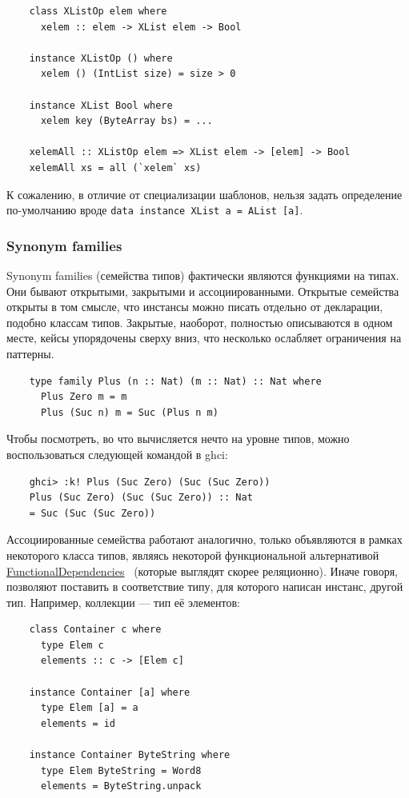 \begin{verbatim}
    class XListOp elem where
      xelem :: elem -> XList elem -> Bool

    instance XListOp () where
      xelem () (IntList size) = size > 0

    instance XList Bool where
      xelem key (ByteArray bs) = ...

    xelemAll :: XListOp elem => XList elem -> [elem] -> Bool
    xelemAll xs = all (`xelem` xs)
\end{verbatim}

К сожалению, в отличие от специализации шаблонов, нельзя задать определение по-умолчанию вроде \texttt{data instance XList a = AList [a]}.

\subsubsection{Synonym families}

Synonym families (семейства типов) фактически являются функциями на типах.
Они бывают открытыми, закрытыми и ассоциированными.
Открытые семейства открыты в том смысле, что инстансы можно писать отдельно от декларации, подобно классам типов.
Закрытые, наоборот, полностью описываются в одном месте, кейсы упорядочены сверху вниз, что несколько ослабляет ограничения на паттерны.

\begin{verbatim}
    type family Plus (n :: Nat) (m :: Nat) :: Nat where
      Plus Zero m = m
      Plus (Suc n) m = Suc (Plus n m)
\end{verbatim}

Чтобы посмотреть, во что вычисляется нечто на уровне типов, можно воспользоваться следующей командой в ghci:
\begin{verbatim}
    ghci> :k! Plus (Suc Zero) (Suc (Suc Zero))
    Plus (Suc Zero) (Suc (Suc Zero)) :: Nat
    = Suc (Suc (Suc Zero))
\end{verbatim}

Ассоциированные семейства работают аналогично, только объявляются в рамках некоторого класса типов, являясь некоторой функциональной альтернативой \href{https://ghc.gitlab.haskell.org/ghc/doc/users_guide/exts/functional_dependencies.html}{FunctionalDependencies}\ \cite{jones2000type} (которые выглядят скорее реляционно).
Иначе говоря, позволяют поставить в соответствие типу, для которого написан инстанс, другой тип.
Например, коллекции --- тип её элементов:

\begin{verbatim}
    class Container c where
      type Elem c
      elements :: c -> [Elem c]

    instance Container [a] where
      type Elem [a] = a
      elements = id

    instance Container ByteString where
      type Elem ByteString = Word8
      elements = ByteString.unpack
\end{verbatim}

